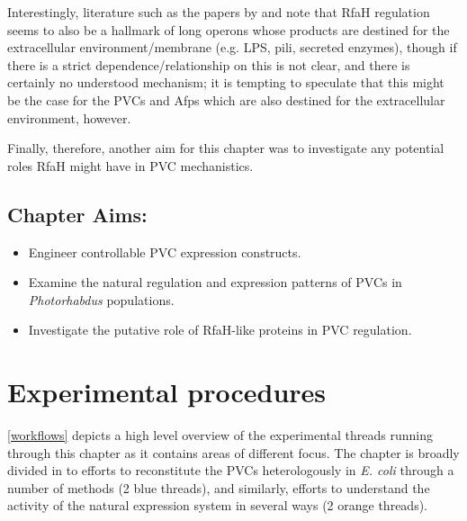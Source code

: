 Interestingly, literature such as the papers by \cite{Bailey1996} and \cite{Santangelo2002} note that RfaH regulation seems to also be a hallmark of long operons whose products are destined for the extracellular environment/membrane (e.g. LPS, pili, secreted enzymes), though if there is a strict dependence/relationship on this is not clear, and there is certainly no understood mechanism; it is tempting to speculate that this might be the case for the PVCs and Afps which are also destined for the extracellular environment, however. 

Finally, therefore, another aim for this chapter was to investigate any potential roles RfaH might have in PVC mechanistics. 

\subsection*{Chapter Aims:}
\begin{itemize}
	\item Engineer controllable PVC expression constructs.
	\item Examine the natural regulation and expression patterns of PVCs in \emph{Photorhabdus} populations.
	\item Investigate the putative role of RfaH-like proteins in PVC regulation.
\end{itemize}
\clearpage


\section{Experimental procedures}

\vref{workflows} depicts a high level overview of the experimental threads running through this chapter as it contains areas of different focus. The chapter is broadly divided in to efforts to reconstitute the PVCs heterologously in \emph{E. coli} through a number of methods (2 blue threads), and similarly, efforts to understand the activity of the natural expression system in several ways (2 orange threads).

